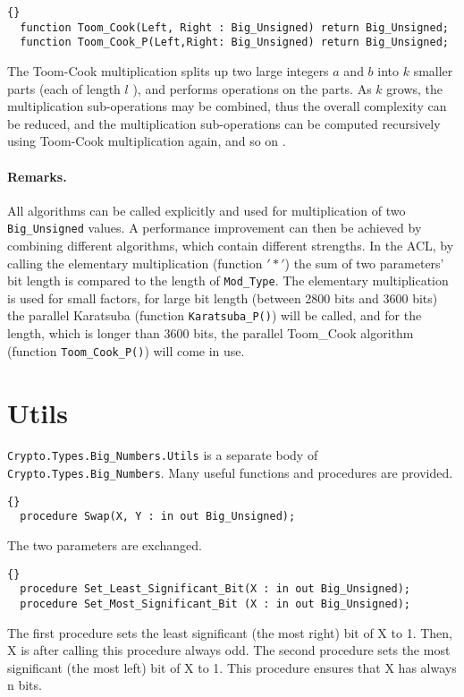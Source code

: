 \hhline
\begin{lstlisting}{}
  function Toom_Cook(Left, Right : Big_Unsigned) return Big_Unsigned;
  function Toom_Cook_P(Left,Right: Big_Unsigned) return Big_Unsigned;
\end{lstlisting}
The Toom-Cook multiplication splits up two large integers $a$ and $b$
into $k$ smaller parts (each of length $l$ ), and performs operations
on the parts. As $k$ grows, the multiplication sub-operations may be
combined, thus the overall complexity can be reduced, and the
multiplication sub-operations can be computed recursively using
Toom-Cook multiplication again, and so on
\cite{DBLP:reference/crypt/2011}.

\paragraph{Remarks.} All algorithms can be called explicitly and used
for multiplication of two \texttt{Big\_Unsigned} values.  A
performance improvement can then be achieved by combining different
algorithms, which contain different strengths. In the ACL, by calling
the elementary multiplication (function $'*'$) the sum of two
parameters' bit length is compared to the length of
\texttt{Mod\_Type}. The elementary multiplication is used for small
factors, for large bit length (between 2800 bits and 3600 bits) the
parallel Karatsuba (function \texttt{Karatsuba\_P()}) will be called,
and for the length, which is longer than 3600 bits, the parallel
Toom\_Cook algorithm (function \texttt{Toom\_Cook\_P()}) will come in
use.
\section{Utils}
\texttt{Crypto.Types.Big\_Numbers.Utils} is a separate body of
\texttt{Crypto.Types.Big\_Numbers}. Many useful functions and
procedures are provided.
\begin{lstlisting}{}
  procedure Swap(X, Y : in out Big_Unsigned);
\end{lstlisting}
The two parameters are exchanged.

\hhline
\begin{lstlisting}{}
  procedure Set_Least_Significant_Bit(X : in out Big_Unsigned);
  procedure Set_Most_Significant_Bit (X : in out Big_Unsigned);
\end{lstlisting}
The first procedure sets the least significant (the most right) bit of
X to 1. Then, X is after calling this procedure always odd. The second
procedure sets the most significant (the most left) bit of X to
1. This procedure ensures that X has always n bits.

